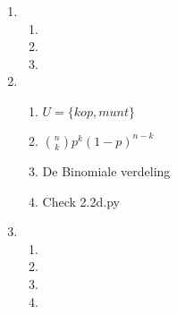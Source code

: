 \documentclass[pdftex,12pt,a4paper]{article}
\begin{document}

\begin{enumerate}
    \item
        \begin{enumerate}
            \item
            	
            \item

            \item

        \end{enumerate}

    \item
        \begin{enumerate}
            \item
                $U=\{kop, munt\}$
            \item
                ${n \choose k} p^k(1-p)^{n-k}$
            \item
            	De Binomiale verdeling
            \item
                Check 2.2d.py
        \end{enumerate}
	\item
    	\begin{enumerate}
    		\item

    		\item

    		\item

            \item

    	\end{enumerate}
\end{enumerate}
\end{document}
